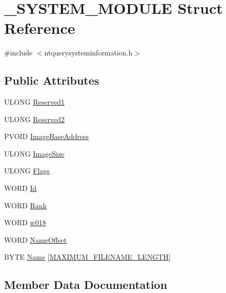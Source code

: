 \section{\-\_\-\-S\-Y\-S\-T\-E\-M\-\_\-\-M\-O\-D\-U\-L\-E Struct Reference}
\label{struct___s_y_s_t_e_m___m_o_d_u_l_e}


{\ttfamily \#include $<$ntquerysysteminformation.\-h$>$}

\subsection*{Public Attributes}
\begin{DoxyCompactItemize}
\item 
U\-L\-O\-N\-G \hyperlink{struct___s_y_s_t_e_m___m_o_d_u_l_e_adcc0c7c1c24eadcac966cc167fc26283}{Reserved1}
\item 
U\-L\-O\-N\-G \hyperlink{struct___s_y_s_t_e_m___m_o_d_u_l_e_aefbc6fa59bd1a809a644b3811ddbf953}{Reserved2}
\item 
P\-V\-O\-I\-D \hyperlink{struct___s_y_s_t_e_m___m_o_d_u_l_e_a45071b485b1b51374cf7ad4298aab446}{Image\-Base\-Address}
\item 
U\-L\-O\-N\-G \hyperlink{struct___s_y_s_t_e_m___m_o_d_u_l_e_a10507e4e6145a651f4798814e54c03e5}{Image\-Size}
\item 
U\-L\-O\-N\-G \hyperlink{struct___s_y_s_t_e_m___m_o_d_u_l_e_a95c79e17a3a8ca6d75a175828cc7e360}{Flags}
\item 
W\-O\-R\-D \hyperlink{struct___s_y_s_t_e_m___m_o_d_u_l_e_af8f4012d5915f778179d9cbe1884f1ac}{Id}
\item 
W\-O\-R\-D \hyperlink{struct___s_y_s_t_e_m___m_o_d_u_l_e_aa1a4be38c36d2a81be768209c6a5375c}{Rank}
\item 
W\-O\-R\-D \hyperlink{struct___s_y_s_t_e_m___m_o_d_u_l_e_a26796dd8286a594b086840fe4316c4ca}{w018}
\item 
W\-O\-R\-D \hyperlink{struct___s_y_s_t_e_m___m_o_d_u_l_e_aa82110ffb332f4d44f208907c3e822f5}{Name\-Offset}
\item 
B\-Y\-T\-E \hyperlink{struct___s_y_s_t_e_m___m_o_d_u_l_e_af7eb57e3d8c7ffc3a82bea61edf9ad9c}{Name} \mbox{[}\hyperlink{ntdll_8h_a4fc6529ce775df5fb3ceff4e7674db71}{M\-A\-X\-I\-M\-U\-M\-\_\-\-F\-I\-L\-E\-N\-A\-M\-E\-\_\-\-L\-E\-N\-G\-T\-H}\mbox{]}
\end{DoxyCompactItemize}


\subsection{Member Data Documentation}
